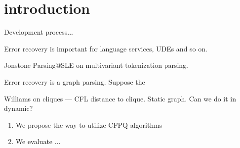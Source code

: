 \section{introduction}

Development process...

Error recovery is important for language services, UDEs and so on.

Jonstone Parsing@SLE on multivariant tokenization parsing.

Error recovery is a graph parsing.
Suppose the

Williams on cliques --- CFL distance to clique.
Static graph.
Can we do it in dynamic?

\begin{enumerate}
\item We propose the way to utilize CFPQ algorithms
\item We evaluate ...
\end{enumerate}
